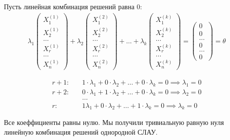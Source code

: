 \begin{answer}
  Пусть линейная комбинация решений равна 0:
  \begin{gather*}
    \lambda_1
   \begin{pmatrix}
       X^{(1)}_1 \\
       X^{(1)}_2 \\
       \ldots \\
       X^{(1)}_r \\
       \ldots \\
       X^{(1)}_n
     \end{pmatrix}
     + \lambda_2
   \begin{pmatrix}
       X^{(2)}_1 \\
       X^{(2)}_2 \\
       \ldots \\
       X^{(2)}_r \\
       \ldots \\
       X^{(2)}_n
    \end{pmatrix}
    + \ldots + \lambda_k
   \begin{pmatrix}
       X^{(k)}_1 \\
       X^{(k)}_2 \\
       \ldots \\
       X^{(k)}_r \\
       \ldots \\
       X^{(k)}_n
    \end{pmatrix}
  = 
  \begin{pmatrix}
    0 \\ 0 \\ \ldots \\ 0 \\ \ldots \\ 0
  \end{pmatrix} = \theta
  \end{gather*}
  
  \begin{align*}
    r+1: \quad &1 \cdot\lambda_1 + 0 \cdot \lambda_2 + \ldots + 0 \cdot \lambda_k = 0 \implies \lambda_1 = 0 \\
    r+2: \quad &0 \cdot\lambda_1 + 1 \cdot \lambda_2 + \ldots + 0 \cdot \lambda_k = 0 \implies \lambda_2 = 0 \\
          &\ldots \\
     r: \quad &1 \lambda_1 + 0 \cdot \lambda_2 + \ldots + 1 \cdot \lambda_k = 0 \implies \lambda_k = 0
  \end{align*}
  
  Все коеффициенты равны нулю. Мы получили тривиальную равную нуля линейную комбинация решений однородной СЛАУ.
\end{answer} 

